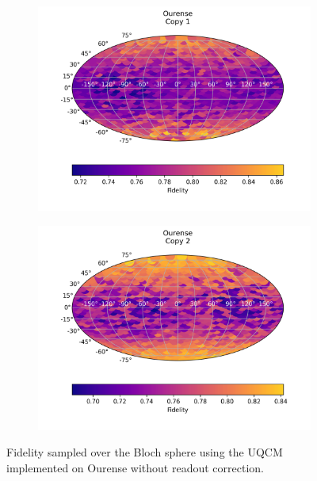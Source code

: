 \begin{figure}[H]
    \centering
    \begin{subfigure}{.5\textwidth}
      \centering
      \includegraphics[width=\textwidth]{Figures/UQCM/IBM/FullSphere/results_ourense_copy1.png}
    \end{subfigure}%
    \begin{subfigure}{.5\textwidth}
      \centering
      \includegraphics[width=\textwidth]{Figures/UQCM/IBM/FullSphere/results_ourense_copy2.png}
    \end{subfigure}
    \caption{Fidelity sampled over the Bloch sphere using the UQCM implemented on Ourense without readout correction.}
\end{figure}


